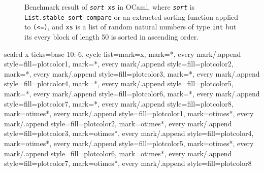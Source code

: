 \documentclass[a4paper]{article}
\begin{document}
\begin{figure}[p]
 \caption{Benchmark result of \texttt{\textit{sort} xs} in OCaml, where \texttt{\textit{sort}} is \texttt{List.stable\_sort compare} or an extracted sorting function applied to \texttt{(<=)}, and \texttt{xs} is a list of random natural numbers of type \texttt{int} but its every block of length 50 is sorted in ascending order.}
\end{figure}

\pgfplotsset
{scaled x ticks=base 10:-6,
 cycle list={{mark=x},
             {mark=*, every mark/.append style={fill=plotcolor1}}, {mark=*, every mark/.append style={fill=plotcolor2}},
             {mark=*, every mark/.append style={fill=plotcolor3}}, {mark=*, every mark/.append style={fill=plotcolor4}},
             {mark=*, every mark/.append style={fill=plotcolor5}}, {mark=*, every mark/.append style={fill=plotcolor6}},
             {mark=*, every mark/.append style={fill=plotcolor7}}, {mark=*, every mark/.append style={fill=plotcolor8}},
             {mark=otimes*, every mark/.append style={fill=plotcolor1}}, {mark=otimes*, every mark/.append style={fill=plotcolor2}},
             {mark=otimes*, every mark/.append style={fill=plotcolor3}}, {mark=otimes*, every mark/.append style={fill=plotcolor4}},
             {mark=otimes*, every mark/.append style={fill=plotcolor5}}, {mark=otimes*, every mark/.append style={fill=plotcolor6}},
             {mark=otimes*, every mark/.append style={fill=plotcolor7}}, {mark=otimes*, every mark/.append style={fill=plotcolor8}}}
}
\end{document}
